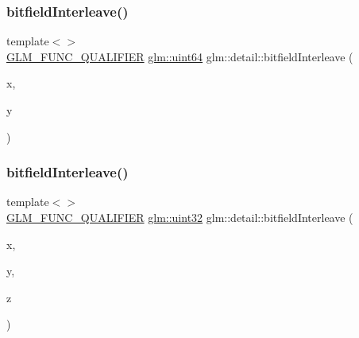 \subsubsection{\texorpdfstring{bitfield\+Interleave()}{bitfieldInterleave()}\hspace{0.1cm}{\footnotesize\ttfamily [6/11]}}
{\footnotesize\ttfamily template$<$$>$ \\
\hyperlink{setup_8hpp_a33fdea6f91c5f834105f7415e2a64407}{G\+L\+M\+\_\+\+F\+U\+N\+C\+\_\+\+Q\+U\+A\+L\+I\+F\+I\+ER} \hyperlink{group__gtc__type__precision_gae3632bf9b37da66233d78930dd06378a}{glm\+::uint64} glm\+::detail\+::bitfield\+Interleave (\begin{DoxyParamCaption}\item[{\hyperlink{group__gtc__type__precision_ga202b6a53c105fcb7e531f9b443518451}{glm\+::uint32}}]{x,  }\item[{\hyperlink{group__gtc__type__precision_ga202b6a53c105fcb7e531f9b443518451}{glm\+::uint32}}]{y }\end{DoxyParamCaption})}

\mbox{\label{namespaceglm_1_1detail_a27e9c62ce3ad180236573daec6a6461f}} 
\subsubsection{\texorpdfstring{bitfield\+Interleave()}{bitfieldInterleave()}\hspace{0.1cm}{\footnotesize\ttfamily [7/11]}}
{\footnotesize\ttfamily template$<$$>$ \\
\hyperlink{setup_8hpp_a33fdea6f91c5f834105f7415e2a64407}{G\+L\+M\+\_\+\+F\+U\+N\+C\+\_\+\+Q\+U\+A\+L\+I\+F\+I\+ER} \hyperlink{group__gtc__type__precision_ga202b6a53c105fcb7e531f9b443518451}{glm\+::uint32} glm\+::detail\+::bitfield\+Interleave (\begin{DoxyParamCaption}\item[{\hyperlink{group__gtc__type__precision_ga1a7dcd8aac97cc8020817c94049deff2}{glm\+::uint8}}]{x,  }\item[{\hyperlink{group__gtc__type__precision_ga1a7dcd8aac97cc8020817c94049deff2}{glm\+::uint8}}]{y,  }\item[{\hyperlink{group__gtc__type__precision_ga1a7dcd8aac97cc8020817c94049deff2}{glm\+::uint8}}]{z }\end{DoxyParamCaption})}

